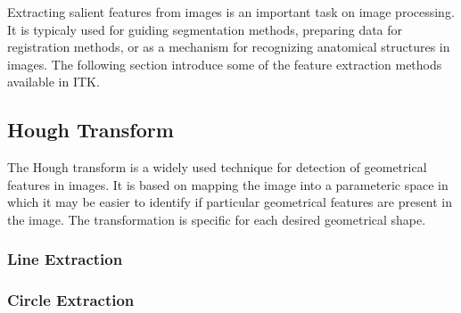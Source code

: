 %
%
% 
%
%
%


Extracting salient features from images is an important task on image
processing.  It is typicaly used for guiding segmentation methods, preparing
data for registration methods, or as a mechanism for recognizing anatomical
structures in images. The following section introduce some of the feature
extraction methods available in ITK.


\subsection{Hough Transform}
\label{sec:HoughtTransform}

The Hough transform is a widely used technique for detection of geometrical
features in images. It is based on mapping the image into a parameteric space
in which it may be easier to identify if particular geometrical features are
present in the image. The transformation is specific for each desired
geometrical shape. 

\subsubsection{Line Extraction}
\label{sec:HoughtLineExtraction}

\ifitkFullVersion

\fi


\subsubsection{Circle Extraction}
\label{sec:HoughtCircleExtraction}

\ifitkFullVersion

\fi



